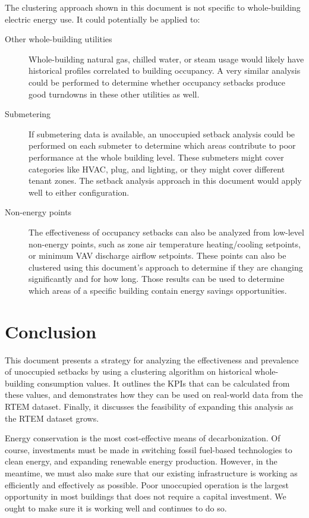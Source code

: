 \documentclass[a4paper]{article}
\begin{document}
The clustering approach shown in this document is not specific to whole-building electric energy use. It could potentially be applied to:
\begin{description}
\item[Other whole-building utilities]{Whole-building natural gas, chilled water, or steam usage would likely have historical profiles correlated to building occupancy. A very similar analysis could be performed to determine whether occupancy setbacks produce good turndowns in these other utilities as well.}
\item[Submetering]{If submetering data is available, an unoccupied setback analysis could be performed on each submeter to determine which areas contribute to poor performance at the whole building level. These submeters might cover categories like HVAC, plug, and lighting, or they might cover different tenant zones. The setback analysis approach in this document would apply well to either configuration.}
\item[Non-energy points]{The effectiveness of occupancy setbacks can also be analyzed from low-level non-energy points, such as zone air temperature heating/cooling setpoints, or minimum VAV discharge airflow setpoints. These points can also be clustered using this document's approach to determine if they are changing significantly and for how long. Those results can be used to determine which areas of a specific building contain energy savings opportunities.}
\end{description}

\section{Conclusion}

This document presents a strategy for analyzing the effectiveness and prevalence of unoccupied setbacks by using a clustering algorithm on historical whole-building consumption values. It outlines the KPIs that can be calculated from these values, and demonstrates how they can be used on real-world data from the RTEM dataset. Finally, it discusses the feasibility of expanding this analysis as the RTEM dataset grows.


Energy conservation is the most cost-effective means of decarbonization. Of course, investments must be made in switching fossil fuel-based technologies to clean energy, and expanding renewable energy production. However, in the meantime, we must also make sure that our existing infrastructure is working as efficiently and effectively as possible. Poor unoccupied operation is the largest opportunity in most buildings that does not require a capital investment. We ought to make sure it is working well and continues to do so.
\end{document}

